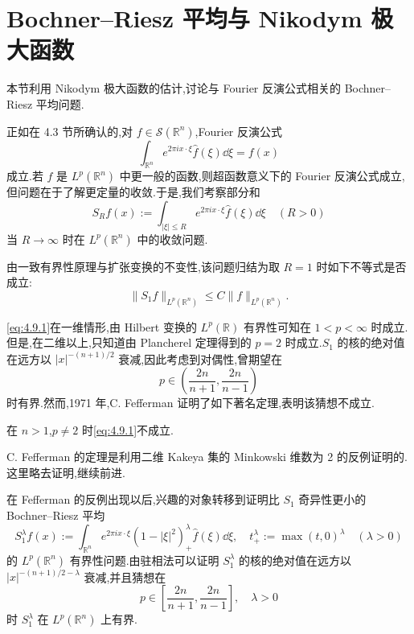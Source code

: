 \section{Bochner--Riesz 平均与 Nikodym 极大函数}\label{sec:4.9}


本节利用 Nikodym 极大函数的估计,讨论与 Fourier 反演公式相关的 Bochner--Riesz 平均问题.

正如在 4.3 节所确认的,对 $f \in \mathcal{S}(\mathbb{R}^{n})$,Fourier 反演公式
\[
\int_{\mathbb{R}^{n}}e^{2\pi i x\cdot\xi}\hat{f}(\xi)\dd\xi = f(x)
\]
成立.若 $f$ 是 $L^{p}(\mathbb{R}^{n})$ 中更一般的函数,则超函数意义下的 Fourier 反演公式成立,但问题在于了解更定量的收敛.于是,我们考察部分和
\[
S_{R}f(x) := \int_{|\xi| \leq R}e^{2\pi i x\cdot\xi}\hat{f}(\xi)\dd\xi \quad (R > 0)
\]
当 $R \to \infty$ 时在 $L^{p}(\mathbb{R}^{n})$ 中的收敛问题.

由一致有界性原理与扩张变换的不变性,该问题归结为取 $R = 1$ 时如下不等式是否成立:
\begin{equation}\tag{4.9.1}
\|S_{1}f\|_{L^{p}(\mathbb{R}^{n})} \leq C\|f\|_{L^{p}(\mathbb{R}^{n})}.
\label{eq:4.9.1}\end{equation}

\eqref{eq:4.9.1}在一维情形,由 Hilbert 变换的 $L^{p}(\mathbb{R})$ 有界性可知在 $1 < p < \infty$ 时成立.但是,在二维以上,只知道由 Plancherel 定理得到的 $p = 2$ 时成立.$S_{1}$ 的核的绝对值在远方以 $|x|^{-(n+1)/2}$ 衰减,因此考虑到对偶性,曾期望在
\[
p \in \left(\frac{2n}{n+1}, \frac{2n}{n-1}\right)
\]
时有界.然而,1971 年,C. Fefferman 证明了如下著名定理,表明该猜想不成立.

\begin{theorem}\label{thm:4.9.1}
在 $n > 1$,$p \neq 2$ 时\eqref{eq:4.9.1}不成立.
\end{theorem}

C. Fefferman 的定理是利用二维 Kakeya 集的 Minkowski 维数为 2 的反例证明的.这里略去证明,继续前进.

在 Fefferman 的反例出现以后,兴趣的对象转移到证明比 $S_{1}$ 奇异性更小的 Bochner--Riesz 平均
\[
S_{1}^{\lambda}f(x) := \int_{\mathbb{R}^{n}}e^{2\pi i x\cdot\xi}(1-|\xi|^{2})_{+}^{\lambda}\hat{f}(\xi)\dd\xi, \quad t_{+}^{\lambda} := \max(t,0)^{\lambda} \quad (\lambda > 0)
\]
的 $L^{p}(\mathbb{R}^{n})$ 有界性问题.由驻相法可以证明 $S_{1}^{\lambda}$ 的核的绝对值在远方以 $|x|^{-(n+1)/2-\lambda}$ 衰减,并且猜想在
\[
p \in \left[\frac{2n}{n+1}, \frac{2n}{n-1}\right], \quad \lambda > 0
\]
时 $S_{1}^{\lambda}$ 在 $L^{p}(\mathbb{R}^{n})$ 上有界.

